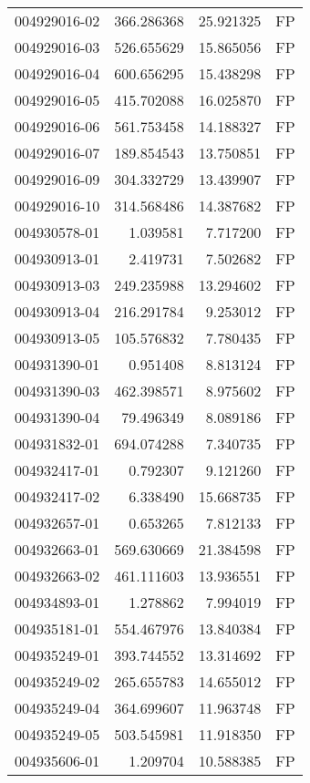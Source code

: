 \begin{tabular}{lrrl}
004929016-02 &  366.286368 &    25.921325 &   FP \\
004929016-03 &  526.655629 &    15.865056 &   FP \\
004929016-04 &  600.656295 &    15.438298 &   FP \\
004929016-05 &  415.702088 &    16.025870 &   FP \\
004929016-06 &  561.753458 &    14.188327 &   FP \\
004929016-07 &  189.854543 &    13.750851 &   FP \\
004929016-09 &  304.332729 &    13.439907 &   FP \\
004929016-10 &  314.568486 &    14.387682 &   FP \\
004930578-01 &    1.039581 &     7.717200 &   FP \\
004930913-01 &    2.419731 &     7.502682 &   FP \\
004930913-03 &  249.235988 &    13.294602 &   FP \\
004930913-04 &  216.291784 &     9.253012 &   FP \\
004930913-05 &  105.576832 &     7.780435 &   FP \\
004931390-01 &    0.951408 &     8.813124 &   FP \\
004931390-03 &  462.398571 &     8.975602 &   FP \\
004931390-04 &   79.496349 &     8.089186 &   FP \\
004931832-01 &  694.074288 &     7.340735 &   FP \\
004932417-01 &    0.792307 &     9.121260 &   FP \\
004932417-02 &    6.338490 &    15.668735 &   FP \\
004932657-01 &    0.653265 &     7.812133 &   FP \\
004932663-01 &  569.630669 &    21.384598 &   FP \\
004932663-02 &  461.111603 &    13.936551 &   FP \\
004934893-01 &    1.278862 &     7.994019 &   FP \\
004935181-01 &  554.467976 &    13.840384 &   FP \\
004935249-01 &  393.744552 &    13.314692 &   FP \\
004935249-02 &  265.655783 &    14.655012 &   FP \\
004935249-04 &  364.699607 &    11.963748 &   FP \\
004935249-05 &  503.545981 &    11.918350 &   FP \\
004935606-01 &    1.209704 &    10.588385 &   FP \\

\end{tabular}
